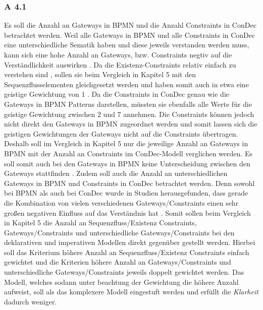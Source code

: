 \subsubsection{A 4.1}
Es soll die Anzahl an Gateways in BPMN und die Anzahl Constraints in ConDec betrachtet werden. Weil alle Gateways in BPMN und alle Constraints in ConDec eine unterschiedliche Sematik haben und diese jeweils verstanden werden muss, kann sich eine hohe Anzahl an Gateways, bzw. Constraints negtiv auf die Verständlichkeit auswirken \cite{gruhn2006adopting, thesis_maja, sabrina933}. \newline
Da die Existenz-Constraints relativ einfach zu verstehen sind \cite{thesis_maja, sabrina933}, sollen sie beim Vergleich in Kapitel 5 mit den Sequenzflusselementen gleichgesetzt werden und haben somit auch in etwa eine geistige Gewichtung von 1 \cite{thesis_maja,haisjackl2014understanding, gruhn2006adopting,sabrina933}. \newline
Da die Constraints in ConDec genau wie die Gateways in BPMN Patterns darstellen, müssten sie ebenfalls alle Werte für die geistige Gewichtung zwischen 2 und 7 annehmen. Die Constraints können jedoch nicht direkt den Gateways in BPMN zugeordnet werden und somit lassen sich die geistigen Gewichtungen der Gateways nicht auf die Constraints übertragen. Deshalb soll im Vergleich in Kapitel 5 nur die jeweilige Anzahl an Gateways in BPMN mit der Anzahl an Constraints im ConDec-Modell verglichen werden. Es soll somit auch bei den Gateways in BPMN keine Unterscheidung zwischen den Gateways stattfinden \cite{thesis_maja,haisjackl2014understanding, gruhn2006adopting}. \newline
Zudem soll auch die Anzahl an unterschiedlichen Gateways in BPMN und Constraints in ConDec betrachtet werden. Denn sowohl bei BPMN als auch bei ConDec wurde in Studien herausgefunden, dass gerade die Kombination von vielen verschiedenen Gateways/Constraints einen sehr großen negativen Einfluss auf das Verständnis hat \cite{gruhn2006adopting, thesis_maja,haisjackl2014understanding, sabrina933}. \newline
Somit sollen beim Vergleich in Kapitel 5 die Anzahl an Sequenzfluss/Existenz Constraints, Gateways/Constraints und unterschiedliche Gateways/Constraints bei den deklarativen und imperativen Modellen direkt gegenüber gestellt werden. Hierbei soll das Kriterium höhere Anzahl an Sequenzfluss/Existenz Constraints einfach gewichtet und die Kriterien höhere Anzahl an Gateways/Constraints und unterschiedliche Gateways/Constraints jeweils doppelt gewichtet werden. Das Modell, welches sodann unter beachtung der Gewichtung die höhere Anzahl aufweist, soll als das komplexere Modell eingestuft werden und erfüllt die \textit{Klarheit} dadurch weniger.

